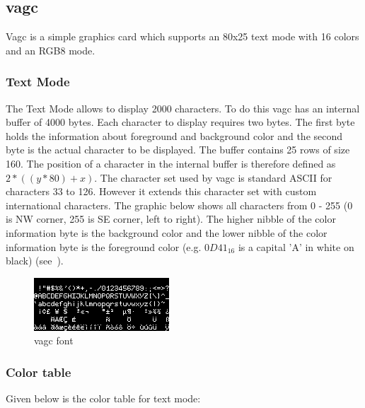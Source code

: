 \subsection{vagc}

Vagc is a simple graphics card which supports an 80x25 text mode with 16 colors and an RGB8 mode. 

\subsubsection{Text Mode}

The Text Mode allows to display 2000 characters. To do this vagc has an internal buffer of 4000 bytes. Each character 
to display requires two bytes. The first byte holds the information about foreground and background color and the second byte
is the actual character to be displayed. The buffer contains 25 rows of size 160. The position of a character in the
internal buffer is therefore defined as $2 * ((y * 80) + x)$. The character set used by vagc is standard ASCII for characters 33 to 126. However it
extends this character set with custom international characters. The graphic below shows all characters from 0 - 255 (0 is NW corner, 255 is SE corner, left to right). 
The higher nibble of the color information byte is the background color and the lower nibble of the color information byte is the foreground color (e.g. $0D41_{16}$ is a capital 'A' in white on black) (see~). 

\begin{figure}[H]
\begin{center}
	\includegraphics{./files/font.png}
\end{center}
	\caption{vagc font}
\end{figure}

\subsubsection{Color table}
\label{sec:colortable}

Given below is the color table for text mode:

